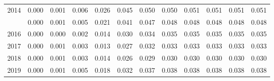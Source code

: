 \documentclass[
]{article}
\begin{document}
\begin{longtable}[t]{lrrrrrrrrrrr}
2014 & 0.000 & 0.001 & 0.006 & 0.026 & 0.045 & 0.050 & 0.050 & 0.051 & 0.051 & 0.051 & 0.051\\
\addlinespace
2015 & 0.000 & 0.001 & 0.005 & 0.021 & 0.041 & 0.047 & 0.048 & 0.048 & 0.048 & 0.048 & 0.048\\
2016 & 0.000 & 0.000 & 0.002 & 0.014 & 0.030 & 0.034 & 0.035 & 0.035 & 0.035 & 0.035 & 0.035\\
2017 & 0.000 & 0.001 & 0.003 & 0.013 & 0.027 & 0.032 & 0.033 & 0.033 & 0.033 & 0.033 & 0.033\\
2018 & 0.000 & 0.001 & 0.003 & 0.014 & 0.026 & 0.029 & 0.030 & 0.030 & 0.030 & 0.030 & 0.030\\
2019 & 0.000 & 0.001 & 0.005 & 0.018 & 0.032 & 0.037 & 0.038 & 0.038 & 0.038 & 0.038 & 0.038\\*
\end{longtable}
\end{document}
